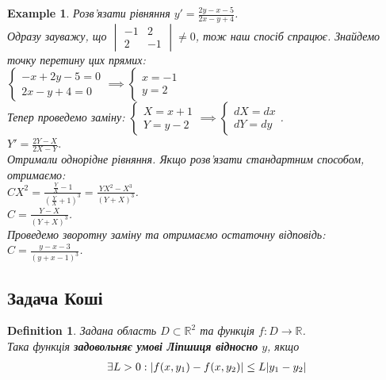 \documentclass[a4paper, 10pt]{article}
\theoremstyle{theoremdd}
\theoremstyle{theoremdd}
\newtheorem{definition}[theorem]{Definition}
\theoremstyle{theoremdd}
\theoremstyle{theoremdd}
\newtheorem{example}[theorem]{Example}
\theoremstyle{theoremdd}
\theoremstyle{theoremdd}
\theoremstyle{theoremdd}
\theoremstyle{theoremdd}
\begin{document}
	\begin{example}
 Розв'язати рівняння $\displaystyle y' = \frac{2y-x-5}{2x-y+4}$.\\
	Одразу зауважу, що $\begin{vmatrix} -1 & 2 \\ 2 & -1 \end{vmatrix} \neq 0$, тож наш спосіб спрацює. Знайдемо точку перетину цих прямих:\\
	$\begin{cases}
	- x + 2y - 5 = 0\\
	2 x - y + 4= 0
	\end{cases} \implies
	\begin{cases}
	x = -1\\
	y = 2
	\end{cases} 
	$\\
	Тепер проведемо заміну:
	$\begin{cases}
	X = x + 1\\
	Y = y -2
	\end{cases} \implies
	\begin{cases}
	dX = dx\\
	dY = dy
	\end{cases}
	$.\\
	$\displaystyle Y' = \frac{2Y-X}{2X-Y}$.\\
	Отримали однорідне рівняння. Якщо розв'язати стандартним способом, отримаємо:\\
	$\displaystyle CX^2 = \frac{\frac{Y}{X}-1}{(\frac{Y}{X}+1)^3} = \frac{YX^2-X^3}{(Y+X)^3}$.\\
	$\displaystyle C = \frac{Y-X}{(Y+X)^3}$.\\
	Проведемо зворотну заміну та отримаємо остаточну відповідь:\\
	$\displaystyle C = \frac{y-x-3}{(y+x-1)^3}$.
	\end{example}
	
	\subsection{Задача Коші}
	\begin{definition}
 Задана область $D \subset \mathbb{R}^2$ та функція $f \colon D \to \mathbb{R}$.\\
	Така функція \textbf{задовольняє умові Ліпшиця відносно} $y$, якщо
	\begin{align*}
	\exists L>0: \abs{f(x,y_1) - f(x,y_2)} \leq L\abs{y_1-y_2}
	\end{align*}
	\end{definition}
	
\end{document}
